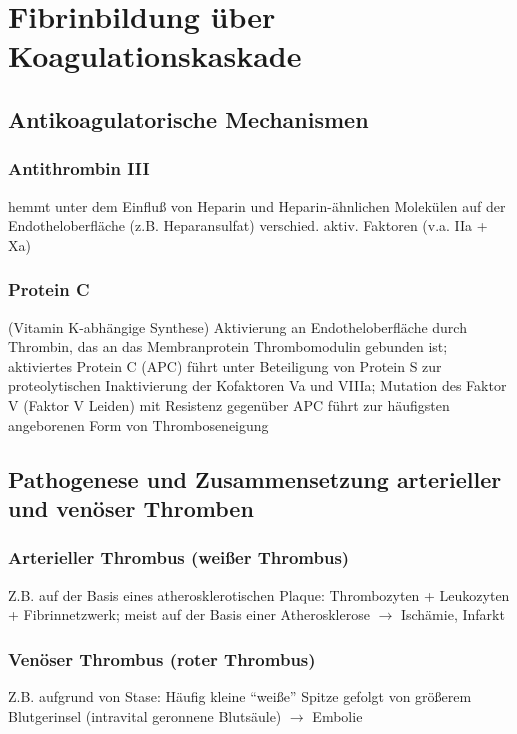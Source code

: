 \documentclass[10pt,a4paper]{report}
\begin{document}
\section{Fibrinbildung über Koagulationskaskade} %
\label{sec:fibrinbildung_ber_koagulationskaskade}
\subsection{Antikoagulatorische 
Mechanismen} %
\label{ssub:antikoagulatorische_mechanismen}
\subsubsection{Antithrombin III} %
\label{par:antithrombin_iii}
hemmt unter dem Einfluß von Heparin und Heparin-ähnlichen Molekülen auf der Endotheloberfläche (z.B. Heparansulfat) verschied. aktiv. Faktoren (v.a. IIa + Xa) 
\subsubsection{Protein C} %
\label{par:protein_c}
(Vitamin K-abhängige Synthese) Aktivierung an Endotheloberfläche durch Thrombin, das an das Membranprotein Thrombomodulin gebunden ist; aktiviertes Protein C (APC) führt unter Beteiligung von Protein S zur proteolytischen Inaktivierung der Kofaktoren Va und VIIIa; Mutation des Faktor V (Faktor V Leiden) mit Resistenz gegenüber APC führt zur häufigsten angeborenen Form von Thromboseneigung
\subsection{Pathogenese und Zusammensetzung arterieller und venöser Thromben} %
\label{ssub:pathogenese_und_zusammensetzung_arterieller_und_ven_ser_thromben}
\subsubsection{Arterieller Thrombus (weißer Thrombus)} %
\label{par:arterieller_thrombus_wei_er_thrombus_}
Z.B. auf der Basis eines atherosklerotischen Plaque: Thrombozyten + Leukozyten + Fibrinnetzwerk; meist auf der Basis einer Atherosklerose $\rightarrow$ Ischämie, Infarkt
\subsubsection{Venöser Thrombus (roter Thrombus)} %
\label{par:ven_ser_thrombus_roter_thrombus_}
Z.B. aufgrund von Stase: Häufig kleine “weiße” Spitze gefolgt von größerem Blutgerinsel (intravital geronnene Blutsäule) $\rightarrow$ Embolie
\end{document}

